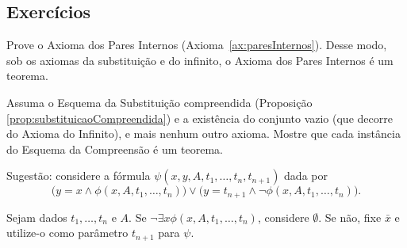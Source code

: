 \subsection*{Exercícios}

\begin{exercise}[$\ZFmPI$]
    Prove o Axioma dos Pares Internos (Axioma~\ref{ax:paresInternos}).
    Desse modo, sob os axiomas da substituição e do infinito, o Axioma dos Pares Internos é um teorema.
\end{exercise}
\begin{exercise}
    Assuma o Esquema da Substituição compreendida (Proposição \ref{prop:substituicaoCompreendida}) e a existência do conjunto vazio (que decorre do Axioma do Infinito), e mais nenhum outro axioma.
    Mostre que cada instância do Esquema da Compreensão é um teorema.

    Sugestão: considere a fórmula $\psi(x, y, A, t_1, \dots, t_n, t_{n+1})$ dada por
    \[
        \Big(y=x \wedge \phi(x, A, t_1, \dots, t_n)\Big)\vee
        \Big(y=t_{n+1} \wedge \neg \phi(x, A, t_1, \dots, t_n)\Big).
    \]

    Sejam dados $t_1, \dots, t_n$ e $A$.
    Se $\neg\exists x \phi(x, A, t_1, \dots, t_n)$, considere $\emptyset$.
    Se não, fixe $\bar x$ e utilize-o como parâmetro $t_{n+1}$ para $\psi$.
\end{exercise}